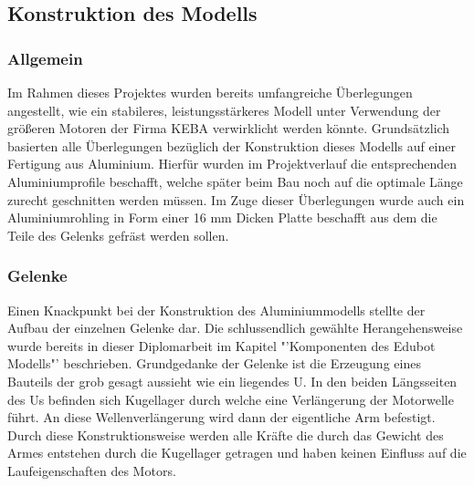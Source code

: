 \subsection{Konstruktion des Modells}
\subsubsection{Allgemein}
Im Rahmen dieses Projektes wurden bereits umfangreiche Überlegungen angestellt, wie ein stabileres, leistungsstärkeres Modell unter Verwendung der größeren Motoren der Firma KEBA verwirklicht werden könnte.
Grundsätzlich basierten alle Überlegungen bezüglich der Konstruktion dieses Modells auf einer Fertigung aus Aluminium. Hierfür wurden im Projektverlauf die entsprechenden Aluminiumprofile beschafft, welche später beim Bau noch auf die optimale Länge zurecht geschnitten werden müssen. 
Im Zuge dieser Überlegungen wurde auch ein Aluminiumrohling in Form einer 16 mm Dicken Platte beschafft aus dem die Teile des Gelenks gefräst werden sollen.

\subsubsection{Gelenke}
Einen Knackpunkt bei der Konstruktion des Aluminiummodells stellte der Aufbau der einzelnen Gelenke dar. Die schlussendlich gewählte Herangehensweise wurde bereits in dieser Diplomarbeit im Kapitel "'Komponenten des Edubot Modells"' beschrieben. Grundgedanke der Gelenke ist die Erzeugung eines Bauteils der grob gesagt aussieht wie ein liegendes U. In den beiden Längsseiten des Us befinden sich Kugellager durch welche eine Verlängerung der Motorwelle führt. 
An diese Wellenverlängerung wird dann der eigentliche Arm befestigt. Durch diese Konstruktionsweise werden alle Kräfte die durch das Gewicht des Armes entstehen durch die Kugellager getragen und haben keinen Einfluss auf die Laufeigenschaften des Motors.
\newpage
